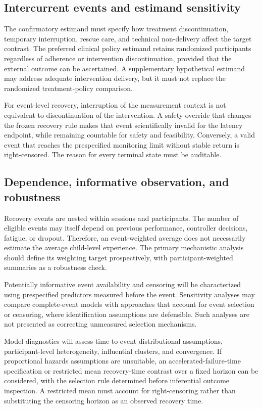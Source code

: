\subsection{Intercurrent events and estimand sensitivity}

The confirmatory estimand must specify how treatment discontinuation, temporary interruption, rescue care, and technical non-delivery affect the target contrast. The preferred clinical policy estimand retains randomized participants regardless of adherence or intervention discontinuation, provided that the external outcome can be ascertained. A supplementary hypothetical estimand may address adequate intervention delivery, but it must not replace the randomized treatment-policy comparison.

For event-level recovery, interruption of the measurement context is not equivalent to discontinuation of the intervention. A safety override that changes the frozen recovery rule makes that event scientifically invalid for the latency endpoint, while remaining countable for safety and feasibility. Conversely, a valid event that reaches the prespecified monitoring limit without stable return is right-censored. The reason for every terminal state must be auditable.

\subsection{Dependence, informative observation, and robustness}

Recovery events are nested within sessions and participants. The number of eligible events may itself depend on previous performance, controller decisions, fatigue, or dropout. Therefore, an event-weighted average does not necessarily estimate the average child-level experience. The primary mechanistic analysis should define its weighting target prospectively, with participant-weighted summaries as a robustness check.

Potentially informative event availability and censoring will be characterized using prespecified predictors measured before the event. Sensitivity analyses may compare complete-event models with approaches that account for event selection or censoring, where identification assumptions are defensible. Such analyses are not presented as correcting unmeasured selection mechanisms.

Model diagnostics will assess time-to-event distributional assumptions, participant-level heterogeneity, influential clusters, and convergence. If proportional hazards assumptions are unsuitable, an accelerated-failure-time specification or restricted mean recovery-time contrast over a fixed horizon can be considered, with the selection rule determined before inferential outcome inspection. A restricted mean must account for right-censoring rather than substituting the censoring horizon as an observed recovery time.

